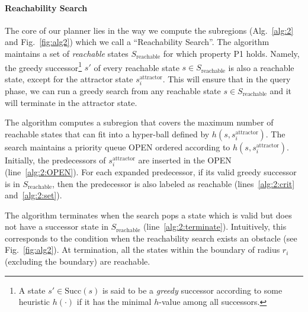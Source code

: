 \documentclass[letterpaper, 10 pt, conference]{ieeeconf}  %
\newcommand{\sAttract}{\ensuremath{s^{\text{attractor}}_i}\xspace}
\begin{document}
\paragraph*{Reachability Search}
The core of our planner lies in the way we compute the subregions (Alg.~\ref{alg:2} and Fig.~\ref{fig:alg2}) which we call a ``Reachability Search''. The algorithm maintains a set of \emph{reachable} states $S_{\text{reachable}}$ for which property P1 holds. 
Namely, the greedy successor\footnote{A state $s' \in \text{Succ}(s)$ is said to be a \emph{greedy} successor according to some heuristic $h(\cdot)$ if it has the minimal $h$-value  among all successors.} $s'$ of every reachable state $s \in S_{\text{reachable}}$ is also a reachable state, except for the attractor state \sAttract. 
This will ensure that in the query phase, we can run a greedy search from any reachable state $s \in S_{\text{reachable}}$ and it will terminate in the attractor state. 

The algorithm computes a subregion that covers the maximum number of reachable states that can fit into a hyper-ball defined by $h(s,\sAttract)$. 
The search maintains a priority queue OPEN ordered according to $h(s,\sAttract)$. Initially, the predecessors of $\sAttract$ are inserted in the OPEN (line~\ref{alg:2:OPEN}). For each expanded predecessor, if its valid greedy successor is in $S_{\text{reachable}}$, then the predecessor is also labeled as reachable (lines~\ref{alg:2:crit} and~\ref{alg:2:set}). 


The algorithm terminates when the search pops a state which is valid but does not have a successor state in $S_{\text{reachable}}$ (line~\ref{alg:2:terminate}). Intuitively, this corresponds to the condition when the reachability search exists an obstacle (see Fig.~\ref{fig:alg2}). At termination, all the states within the boundary of radius $r_i$ (excluding the boundary) are reachable.
\end{document}

